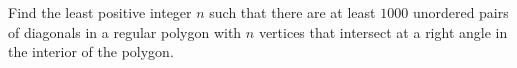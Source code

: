 Find the least positive integer  $n$  such that there are at least $1000$  unordered pairs of diagonals in a regular polygon with $n$  vertices that intersect at a right angle in the interior of the polygon.
